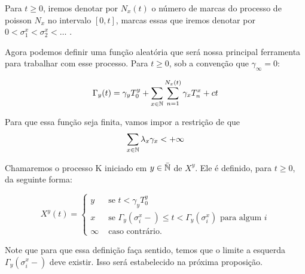 Para $t \geq 0$, iremos denotar por $N_x(t)$ o número de marcas do
processo de poisson $N_x$ no intervalo $[0, t]$, marcas essas que
iremos denotar por $0 < \sigma_1^x < \sigma_2^x < \ldots$ .

Agora podemos definir uma função aleatória que será nossa principal
ferramenta para trabalhar com esse processo. Para $t \geq 0$, sob a
convenção que $\gamma_\infty = 0$:

\begin{equation}
  \label{def:Gamma}
  \Gamma_y (t) = \gamma_y T_0^y
  + \sum_{x \in {\mathbb{N}}} \sum_{n = 1}^{N_x(t)}
  \gamma_x T_n^x
  + ct
\end{equation}

Para que essa função seja \qc finita, vamos impor a restrição de que
\begin{equation}
  \sum_{x \in {\mathbb{N}}} \lambda_x\gamma_x < +\infty
\end{equation}

Chamaremos o processo K iniciado em $y \in {\bar{{\mathbb{N}}}}$ de $X^y$. Ele é
definido, para $t \geq 0$, da seguinte forma:

\begin{equation}
  \label{def:procK}
  X^y (t) =
  \begin{cases}
    y & \textrm{ se }  t < \gamma_y T_0^y\\
    x & \textrm{ se } \Gamma_y(\sigma_i^x-) \leq t <
    \Gamma_y(\sigma^x_i)
    \textrm{ para algum } i \\
    \infty & \textrm{ caso contrário.}
  \end{cases}
\end{equation}

Note que para que essa definição faça sentido, temos que o limite a
esquerda $\Gamma_y (\sigma_i^x-)$ deve existir. Isso será estabelecido
na próxima proposição.

